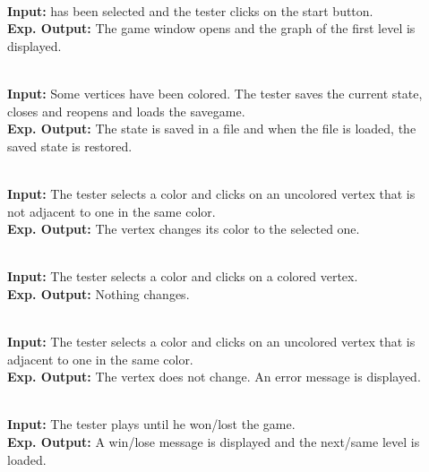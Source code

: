 \begin{description}
	\item[] \textbf{} \\
	\textbf{Input:} \graphcoloring has been selected and the tester clicks on the start button. \\
	\textbf{Exp. Output:} The game window opens and the graph of the first level is displayed.
	
	\item[] \textbf{} \\
	\textbf{Input:} Some vertices have been colored. The tester saves the current state, closes and reopens \graphcoloring and loads the savegame. \\
	\textbf{Exp. Output:} The state is saved in a file and when the file is loaded, the saved state is restored.
	
	\item[] \textbf{} \\
	\textbf{Input:} The tester selects a color and clicks on an uncolored vertex that is not adjacent to one in the same color. \\
	\textbf{Exp. Output:} The vertex changes its color to the selected one.
	
	\item[] \textbf{} \\
	\textbf{Input:} The tester selects a color and clicks on a colored vertex. \\
	\textbf{Exp. Output:} Nothing changes.
	
	\item[] \textbf{} \\
	\textbf{Input:} The tester selects a color and clicks on an uncolored vertex that is adjacent to one in the same color. \\
	\textbf{Exp. Output:} The vertex does not change. An error message is displayed.
	
	\item[] \textbf{} \\
	\textbf{Input:} The tester plays until he won/lost the game. \\
	\textbf{Exp. Output:} A win/lose message is displayed and the next/same level is loaded.
\end{description}

